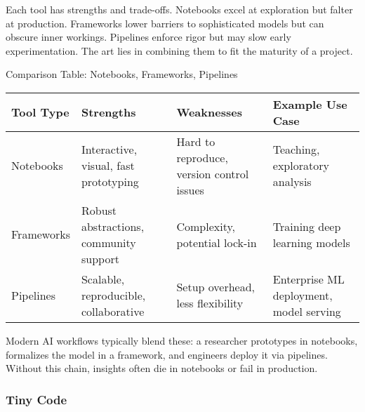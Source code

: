 \documentclass[
  letterpaper,
  DIV=11,
  numbers=noendperiod]{scrreprt}
\begin{document}
Each tool has strengths and trade-offs. Notebooks excel at exploration
but falter at production. Frameworks lower barriers to sophisticated
models but can obscure inner workings. Pipelines enforce rigor but may
slow early experimentation. The art lies in combining them to fit the
maturity of a project.

Comparison Table: Notebooks, Frameworks, Pipelines

\begin{longtable}[]{@{}
  >{\raggedright\arraybackslash}p{}
  >{\raggedright\arraybackslash}p{}
  >{\raggedright\arraybackslash}p{}
  >{\raggedright\arraybackslash}p{}@{}}
\toprule\noalign{}
\begin{minipage}[b]{\linewidth}\raggedright
Tool Type
\end{minipage} & \begin{minipage}[b]{\linewidth}\raggedright
Strengths
\end{minipage} & \begin{minipage}[b]{\linewidth}\raggedright
Weaknesses
\end{minipage} & \begin{minipage}[b]{\linewidth}\raggedright
Example Use Case
\end{minipage} \\
\midrule\noalign{}
\endhead
\bottomrule\noalign{}
\endlastfoot
Notebooks & Interactive, visual, fast prototyping & Hard to reproduce,
version control issues & Teaching, exploratory analysis \\
Frameworks & Robust abstractions, community support & Complexity,
potential lock-in & Training deep learning models \\
Pipelines & Scalable, reproducible, collaborative & Setup overhead, less
flexibility & Enterprise ML deployment, model serving \\
\end{longtable}

Modern AI workflows typically blend these: a researcher prototypes in
notebooks, formalizes the model in a framework, and engineers deploy it
via pipelines. Without this chain, insights often die in notebooks or
fail in production.

\subsubsection{Tiny Code}\label{tiny-code-92}
\end{document}
